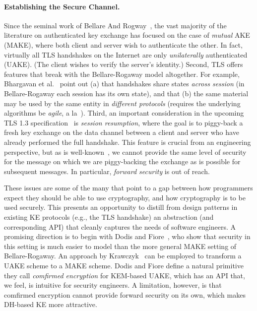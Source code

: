 {\paragraph{Establishing the Secure Channel. }
%
%
Since the seminal work of Bellare And Rogway~\cite{BR93}, the vast majority of
the literature on authenticated key exchange has focused on the case of
\emph{mutual} AKE (MAKE), where both client and server wish to authenticate the
other. In fact, virtually all TLS handshakes on the Internet are only
\emph{unilaterally} authenticated (UAKE). (The client wishes to verify the
server's identity.)
%
Second, TLS offers features that break with the Bellare-Rogaway model
altogether. For example, Bhargavan et al.~\cite{bhargavan2014proving} point
out (a) that handshakes share states \emph{across session} (in
Bellare-Rogaway each session has its own state), and that (b) the same
material may be used by the same entity in \emph{different protocols}
(requires the underlying algorithms be \emph{agile}, a
la~\cite{acar2010cryptographic}).
%
Third, an important consideration in the upcoming TLS 1.3
specification~\cite{tls13} is \emph{session resumption}, where the goal is
to piggy-back a fresh key exchange on the data channel between a client and
server who have already performed the full handshake.
%
This feature is crucial from an engineering perspective, but as is
well-known~\cite[Section 2.2]{tls13}, we cannot provide the same level of
security for the message on which we are piggy-backing the exchange as is
possible for subsequent messages. In particular, \emph{forward security} is out
of reach.

These issues are some of the many that point to a gap between how programmers
expect they should be able to use cryptography, and how cryptography is to be
used securely. This presents an opportunity to distill from design patterns in
existing KE protocols (e.g., the TLS handshake) an abstraction (and
corresponding API) that cleanly captures the needs of software engineers.
%
A promising direction is to begin with Dodis and
Fiore~\cite{dodis2017unilateral}, who show that security in this setting is
much easier to model than the more general MAKE setting of Bellare-Rogaway.
An approach by Krawczyk~\cite{krawczyk2016unilateral-to-mutual} can be
employed to transform a UAKE scheme to a MAKE scheme.
%
Dodis and Fiore define a natural primitive they call
\emph{comfirmed encryption} for KEM-based UAKE, which has an API that, we
feel, is intuitive for security engineers.
%
A limitation, however, is that comfirmed encryption cannot provide forward
security on its own, which makes DH-based KE more attractive.

}
